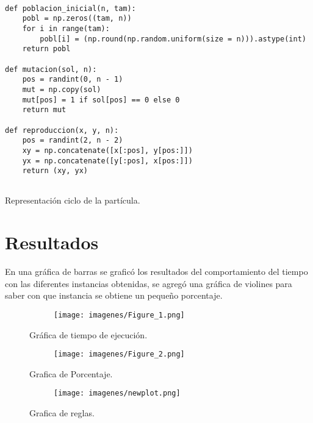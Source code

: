 \documentclass{article}
\begin{document}
\renewcommand{\listingscaption}{Código}
\begin{listing}[H]

\begin{verbatim}

def poblacion_inicial(n, tam):
    pobl = np.zeros((tam, n))
    for i in range(tam):
        pobl[i] = (np.round(np.random.uniform(size = n))).astype(int)
    return pobl
 
def mutacion(sol, n):
    pos = randint(0, n - 1)
    mut = np.copy(sol)
    mut[pos] = 1 if sol[pos] == 0 else 0
    return mut
  
def reproduccion(x, y, n):
    pos = randint(2, n - 2)
    xy = np.concatenate([x[:pos], y[pos:]])
    yx = np.concatenate([y[:pos], x[pos:]])
    return (xy, yx)
    
  \end{verbatim}
  \label{lst:fibo}
  \caption{Representación ciclo de la partícula.}
\end{listing}




\newpage
\section{Resultados}
En una gráfica de barras se graficó los resultados del comportamiento del tiempo con las diferentes instancias obtenidas, se agregó una gráfica de violines para saber con que instancia se obtiene un pequeño porcentaje.


\begin{figure}[H]
\centering
\begin{subfigure}[b]{1.0\linewidth}
\texttt{[image: imagenes/Figure\_1.png]}
\end{subfigure}
\caption{Gráfica de tiempo de ejecución.}
\label{fig:westminster}
\end{figure}


\begin{figure}[H]
\centering
\begin{subfigure}[b]{1.0\linewidth}
\texttt{[image: imagenes/Figure\_2.png]}
\end{subfigure}
\caption{Grafica de Porcentaje.}
\label{fig:westminster}
\end{figure}



\begin{figure}[H]
\centering
\begin{subfigure}[b]{1.0\linewidth}
\texttt{[image: imagenes/newplot.png]}
\end{subfigure}
\caption{Grafica de reglas.}
\label{fig:westminster}
\end{figure}
\end{document}
